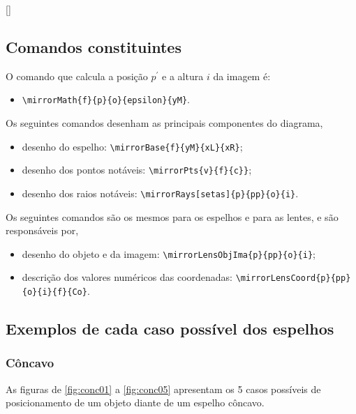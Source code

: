\documentclass[a4paper,10pt]{article}
\begin{document}
\begin{table}[!ht]
  \centering
  [\linewidth]{
    
  }
\end{table}

\subsection{Comandos constituintes}

O comando que calcula a posição $p^{\prime}$ e a altura $i$ da imagem é:
\begin{itemize}
  \item \verb|\mirrorMath{f}{p}{o}{epsilon}{yM}|.
\end{itemize}

Os seguintes comandos desenham as principais componentes do diagrama,
\begin{itemize}
  \item desenho do espelho: \verb|\mirrorBase{f}{yM}{xL}{xR}|;
  \item desenho dos pontos notáveis: \verb|\mirrorPts{v}{f}{c}}|;
  \item desenho dos raios notáveis: \verb|\mirrorRays[setas]{p}{pp}{o}{i}|.
\end{itemize}

Os seguintes comandos são os mesmos para os espelhos e para as lentes, e são responsáveis por,
\begin{itemize}
  \item desenho do objeto e da imagem: \verb|\mirrorLensObjIma{p}{pp}{o}{i}|;
  \item descrição dos valores numéricos das coordenadas: \verb|\mirrorLensCoord{p}{pp}{o}{i}{f}{Co}|.
\end{itemize}

\subsection{Exemplos de cada caso possível dos espelhos}

\subsubsection{Côncavo}

As figuras de \ref{fig:conc01} a \ref{fig:conc05} apresentam os 5 casos possíveis de posicionamento de um objeto diante de um espelho côncavo.

\end{document}

